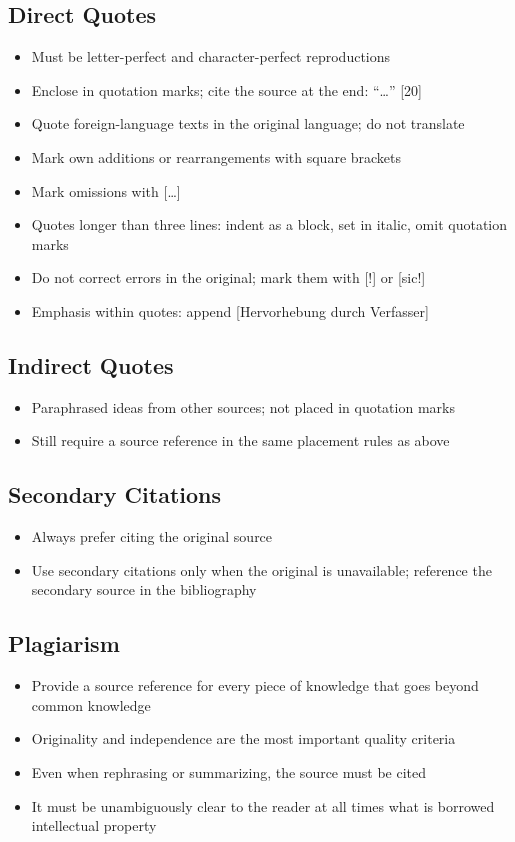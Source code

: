 \subsection{Direct Quotes}
\begin{itemize}
    \item Must be letter-perfect and character-perfect reproductions
    \item Enclose in quotation marks; cite the source at the end: ``\ldots'' [20]
    \item Quote foreign-language texts in the original language; do not translate
    \item Mark own additions or rearrangements with square brackets
    \item Mark omissions with [\ldots]
    \item Quotes longer than three lines: indent as a block, set in italic, omit quotation marks
    \item Do not correct errors in the original; mark them with [!] or [sic!]
    \item Emphasis within quotes: append [Hervorhebung durch Verfasser]
\end{itemize}

\subsection{Indirect Quotes}
\begin{itemize}
    \item Paraphrased ideas from other sources; not placed in quotation marks
    \item Still require a source reference in the same placement rules as above
\end{itemize}

\subsection{Secondary Citations}
\begin{itemize}
    \item Always prefer citing the original source
    \item Use secondary citations only when the original is unavailable; reference the secondary source in the bibliography
\end{itemize}

\subsection{Plagiarism}
\begin{itemize}
    \item Provide a source reference for every piece of knowledge that goes beyond common knowledge
    \item Originality and independence are the most important quality criteria
    \item Even when rephrasing or summarizing, the source must be cited
    \item It must be unambiguously clear to the reader at all times what is borrowed intellectual property
\end{itemize}

